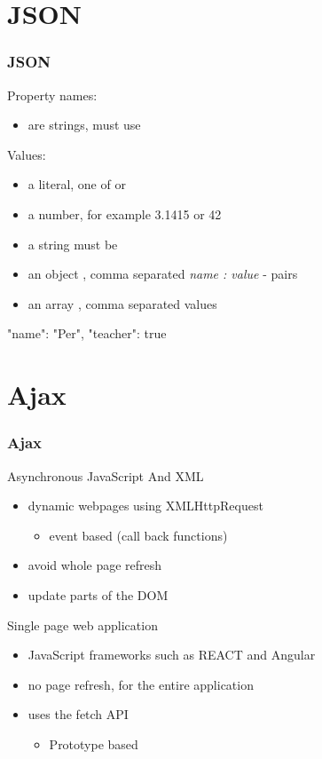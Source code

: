 \section{JSON}
\begin{frame}[fragile]\frametitle{JSON}
Property names:
\begin{itemize}
  \item  are strings, must use 
\end{itemize}
Values:
\begin{itemize}
  \item  a literal, one of  or 
  \item  a number, for example 3.1415 or 42
  \item  a string must be 
  \item  an object \code{\{\}}, comma separated \emph{name : value} - pairs
  \item  an array \code{[]}, comma separated values
\end{itemize}
\begin{CodeBox}{}
{"name": "Per", "teacher": true }
\end{CodeBox}
\end{frame}


\section{Ajax}
\begin{frame}[fragile]\frametitle{Ajax}
Asynchronous JavaScript And XML
\begin{itemize}
  \item dynamic webpages using XMLHttpRequest
  \begin{itemize}
    \item event based (call back functions)
  \end{itemize}
  \item avoid whole page refresh
  \item update parts of the DOM
\end{itemize}
Single page web application
\begin{itemize}
  \item JavaScript frameworks such as REACT and Angular
  \item no page refresh, for the entire application
  \item uses the fetch API
  \begin{itemize}
    \item Prototype based
  \end{itemize}
\end{itemize}
\end{frame}

